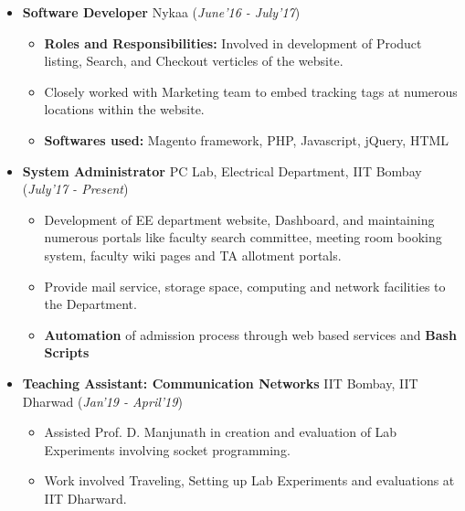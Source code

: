 \documentclass[10pt]{article}
\newcommand{\highlight}[1]{\framecolorbox[\textwidth]{black}{bl}{\makebox[\textwidth][l]{\bfseries \color{black} #1}}}
\begin{document}
\highlight{WORK EXPERIENCE}
\begin{itemize}
	\item \textbf{Software Developer} \textpipe  \hspace{0.05cm} Nykaa \hfill{(\textit{June'16 - July'17})}\\[-0.6cm]
	\begin{itemize}
		\item \textbf{Roles and Responsibilities:} Involved in development of Product listing, Search, and Checkout verticles of the website.
		\item Closely worked with Marketing team to embed  tracking tags at numerous locations within the website.
		\item \textbf{Softwares used:} Magento framework, PHP, Javascript, jQuery, HTML
	\end{itemize}
	\item \textbf{System Administrator} \textpipe \hspace{0.05cm} PC Lab, Electrical Department, IIT Bombay \hfill{(\textit{July'17 - Present})}\\[-0.6cm]
	\begin{itemize}
		\item Development of EE department website, Dashboard, and maintaining numerous portals like faculty search committee, meeting room booking system, faculty wiki pages and TA allotment portals.
		\item Provide mail service, storage space, computing and network facilities to the Department.
		\item \textbf{Automation} of admission process through web based services and \textbf{Bash Scripts}
	\end{itemize}
	
	\item \textbf{Teaching Assistant: Communication Networks} \textpipe \hspace{0.05cm} IIT Bombay, IIT Dharwad \hfill{(\textit{Jan'19 - April'19})}\\[-0.6cm]
	\begin{itemize}
		\item Assisted Prof. D. Manjunath in creation and evaluation of Lab Experiments involving socket programming.
		\item Work involved Traveling, Setting up Lab Experiments and evaluations at IIT Dharward.
	\end{itemize}
\end{itemize}
\end{document}
